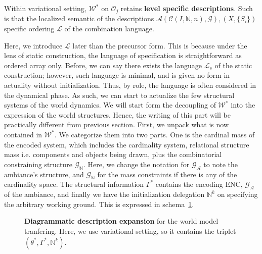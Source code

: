 \begin{observation}
	Within variational setting, $\mathcal{W}^{*}$ on $\mathcal{O}_{j}$ retains \textbf{level specific descriptions}. Such is that the localized semantic of the descriptions $\mathcal{A}(\mathcal{C}(I,\mathbb{N},n),\mathcal{G}),(X,\{S_{i}\})$ specific ordering $\mathcal{L}$ of the combination language. 
\end{observation}

Here, we introduce $\mathcal{L}$ later than the precursor form. This is because under the lens of static construction, the language of specification is straightforward as ordered array only. Before, we can say there exists the language $\mathcal{L}_{s}$ of the static construction; however, such language is minimal, and is given no form in actuality without initialization. Thus, by role, the language is often considered in the dynamical phase. As such, we can start to actualize the few structural systems of the world dynamics. We will start form the decoupling of $\mathcal{W}^{*}$ into the expression of the world structures. Hence, the writing of this part will be practically different from previous section. First, we unpack what is now contained in $\mathcal{W}^{*}$. We categorize them into two parts. One is the cardinal mass of the encoded system, which includes the cardinality system, relational structure mass i.e. components and objects being drawn, plus the combinatorial constraining structure $\mathcal{G}_{\mathbb{N}}$. Here, we change the notation for $\mathcal{G}_{\mathcal{A}}$ to note the ambiance's structure, and $\mathcal{G}_{\mathbb{N}}$ for the mass constraints if there is any of the cardinality space. The structural information $\Gamma^{*}$ contains the encoding $\mathrm{ENC}$, $\mathcal{G}_{\mathcal{A}}$ of the ambiance, and finally we have the initialization delegation $\mathbb{N}^{k}$ on specifying the arbitrary working ground. This is expressed in schema~\ref{diag:world_expansion_1}.

\begin{figure}[htb]
	\centering
	\caption{\textbf{Diagrammatic description expansion} for the world model tranfering. Here, we use variational setting, so it contains the triplet $(\theta^{*},\Gamma^{*},\mathbb{N}^{k})$.}
	\label{diag:world_expansion_1}
\end{figure}


